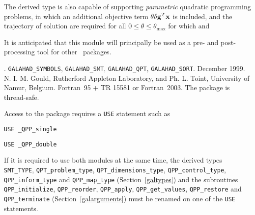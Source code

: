 \documentclass{galahad}
\newcommand{\packagename}{QPP}
\newcommand{\fullpackagename}{\libraryname\_\packagename}
\begin{document}
The derived type is also capable of supporting {\em parametric}
quadratic programming problems, in which an additional objective
term $\theta \delta {\mathbf{g}}^T {\mathbf{x}}$ is included, and the trajectory of 
solution are required for all $0 \leq \theta \leq \theta_{\max}$ 
for which
and 

It is anticipated that this module will principally be used as a pre- and 
post-processing tool for other \galahad\ packages.


\galattributes
\galversions{\tt  \fullpackagename\_single, \fullpackagename\_double}.
\galuses
{\tt GALAHAD\_SY\-M\-BOLS}, 
{\tt GALAHAD\_SMT}, 
{\tt GALAHAD\_QPT},
{\tt GALAHAD\_SORT}.
\galdate December 1999.
\galorigin N. I. M. Gould, Rutherford Appleton Laboratory, and
Ph. L. Toint, University of Namur, Belgium.
\gallanguage Fortran~95 + TR 15581 or Fortran~2003. 
The package is thread-safe.


\galhowto


Access to the package requires a {\tt USE} statement such as

\medskip{}

\hspace{8mm} {\tt USE \fullpackagename\_single}

\medskip{}

\hspace{8mm} {\tt USE  \fullpackagename\_double}

\medskip

\noindent
If it is required to use both modules at the same time, the derived types 
{\tt SMT\_TYPE},
{\tt QPT\_problem\_type},
{\tt QPT\_dimensions\_type}, 
{\tt \packagename\_control\_type}, 
\sloppy
{\tt \packagename\_inform\_type} 
and
{\tt \packagename\_map\_type}
(Section~\ref{galtypes})
and the subroutines
{\tt \packagename\_initialize}, 
{\tt \packagename\_reorder},
{\tt \packagename\_apply}, 
{\tt \packagename\_get\_values}, 
{\tt \packagename\_restore}
and
{\tt \packagename\_terminate} 
(Section~\ref{galarguments})
must be renamed on one of the {\tt USE} statements.
\end{document}
